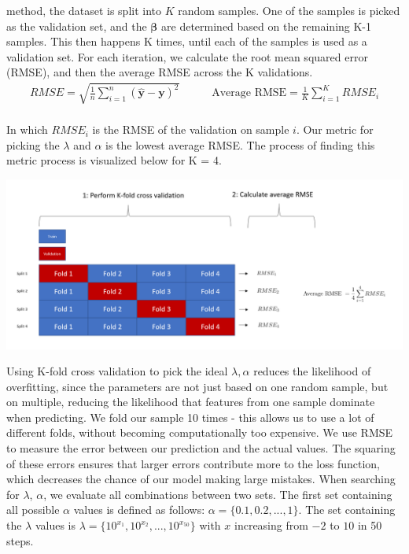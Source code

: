 \documentclass[
]{article}
\begin{document}
method, the dataset is split into \(K\) random samples. One of the
samples is picked as the validation set, and the \(\boldsymbol{\beta}\)
are determined based on the remaining K-1 samples. This then happens K
times, until each of the samples is used as a validation set. For each
iteration, we calculate the root mean squared error (RMSE), and then the
average RMSE across the K validations. \begin{align*}
    RMSE = \sqrt{ \frac{1}{n} \sum_{i=1}^{n} (\hat{\boldsymbol{y}} - \boldsymbol{y})^2 } \hspace{35pt} \text{Average RMSE} = \frac{1}{K}\sum_{i=1}^{K} RMSE_i 
\end{align*}\\
In which \(RMSE_i\) is the RMSE of the validation on sample \(i\). Our
metric for picking the \(\lambda\) and \(\alpha\) is the lowest average
RMSE. The process of finding this metric process is visualized below for
K = 4.

\includegraphics[]{kfold.PNG}

Using K-fold cross validation to pick the ideal \(\lambda, \alpha\)
reduces the likelihood of overfitting, since the parameters are not just
based on one random sample, but on multiple, reducing the likelihood
that features from one sample dominate when predicting. We fold our
sample 10 times - this allows us to use a lot of different folds,
without becoming computationally too expensive. We use RMSE to measure
the error between our prediction and the actual values. The squaring of
these errors ensures that larger errors contribute more to the loss
function, which decreases the chance of our model making large mistakes.
When searching for \(\lambda\), \(\alpha\), we evaluate all combinations
between two sets. The first set containing all possible \(\alpha\)
values is defined as follows: \(\alpha = \{0.1, 0.2,..., 1\}\). The set
containing the \(\lambda\) values is
\(\lambda = \{10^{x_{1}}, 10^{x_{2}},..., 10^{x_{50}}\}\) with \(x\)
increasing from \(-2\) to \(10\) in 50 steps.
\end{document}
